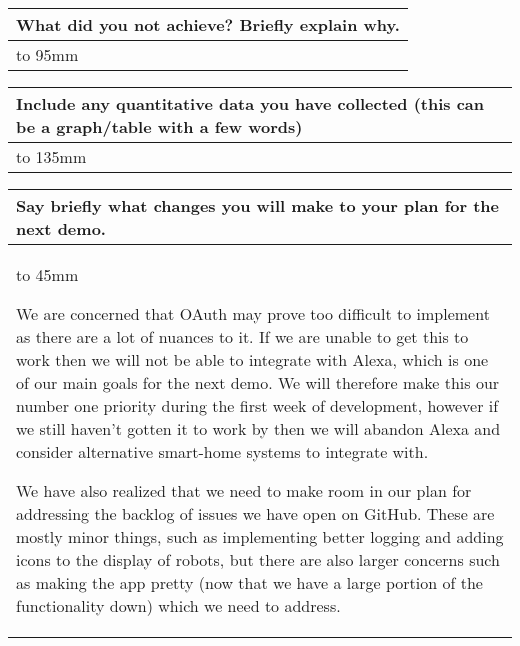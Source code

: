 \documentclass[a4paper]{article}
\newcommand{\colWidth}{141mm}
\begin{document}
\begin{center}

\begin{tabular}{|p{\colWidth}|}
	\hline
	\cellcolor{blue!25}\large
	\textbf{What did you not achieve? Briefly explain why.}
	\\ \hline
	\vtop to 95mm{

  }
  \\
  \hline
\end{tabular}
\vskip 5mm


\begin{tabular}{|p{\colWidth}|}
	\hline
	\cellcolor{blue!25}\large
	\textbf{Include any quantitative data you have collected (this can be a graph/table with a few words)}
	\\ \hline
	\vtop to 135mm{
  }
  \\
  \hline
\end{tabular}
\vskip 5mm


\begin{tabular}{|p{\colWidth}|}
	\hline
	\cellcolor{blue!25}\large
	\textbf{Say briefly what changes you will make to your plan for the next demo.}
	\\ \hline
	\vtop to 45mm{
		We are concerned that OAuth may prove too difficult to implement as there are a lot of nuances to it.
		If we are unable to get this to work then we will not be able to integrate with Alexa, which is one of
		our main goals for the next demo. We will therefore make this our number one priority during the first
		week of development, however if we still haven't gotten it to work by then we will abandon Alexa and
		consider alternative smart-home systems to integrate with.

		\vspace{2mm}

		We have also realized that we need to make room in our plan for addressing the backlog of issues we have
		open on GitHub. These are mostly minor things, such as implementing better logging and adding icons to the display of robots,
		but there are also larger concerns such as making the app pretty (now that we have a large portion of the functionality down)
		which we need to address.
  	}
  \\
  \hline
\end{tabular}

\end{center}
  
\end{document}
